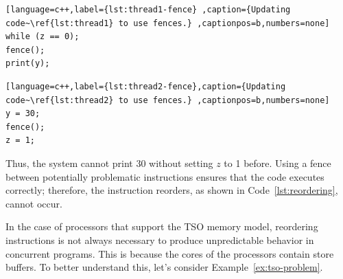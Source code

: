 \begin{example}
\begin{lstlisting}[language=c++,label={lst:thread1-fence} ,caption={Updating code~\ref{lst:thread1} to use fences.} ,captionpos=b,numbers=none]
while (z == 0);
fence();
print(y);
\end{lstlisting}

\begin{lstlisting}[language=c++,label={lst:thread2-fence},caption={Updating code~\ref{lst:thread2} to use fences.} ,captionpos=b,numbers=none]
y = 30;
fence();
z = 1;
\end{lstlisting}

Thus, the system cannot print 30 without setting \(z\) to 1 before. Using a fence between potentially problematic instructions ensures that the code executes correctly; therefore, the instruction reorders, as shown in Code~\ref{lst:reordering}, cannot occur.
\end{example}


In the case of processors that support the TSO memory model, reordering instructions is not always necessary to produce unpredictable behavior in concurrent programs. This is because the cores of the processors contain store buffers. To better understand this, let's consider Example~\ref{ex:tso-problem}.

